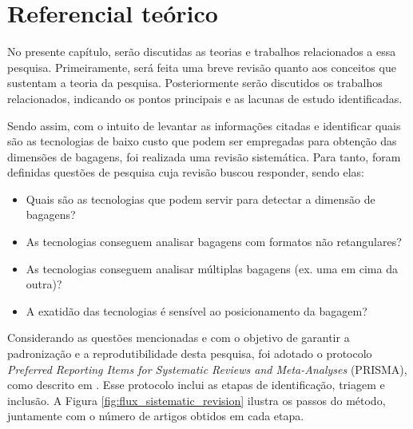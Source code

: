 \chapter[Referencial teórico]{Referencial teórico}
\label{cap_Referencial teorico}
    
    No presente capítulo, serão discutidas as teorias e trabalhos relacionados a essa pesquisa. Primeiramente, será feita uma breve revisão quanto aos conceitos que sustentam a teoria da pesquisa. Posteriormente serão discutidos os trabalhos relacionados, indicando os pontos principais e as lacunas de estudo identificadas.  
    
    Sendo assim, com o intuito de levantar as informações citadas e identificar quais são as tecnologias de baixo custo que podem ser empregadas para obtenção das dimensões de bagagens, foi realizada uma revisão sistemática. Para tanto, foram definidas questões de pesquisa cuja revisão buscou responder, sendo elas:
    
    \begin{itemize}
        \item Quais são as tecnologias que podem servir para detectar a dimensão de bagagens?
        \item As tecnologias conseguem analisar bagagens com formatos não retangulares?
        \item As tecnologias conseguem analisar múltiplas bagagens (ex. uma em cima da outra)?
        \item A exatidão das tecnologias é sensível ao posicionamento da bagagem?
    \end{itemize}
    

    Considerando as questões mencionadas e com o objetivo de garantir a padronização e a reprodutibilidade desta pesquisa, foi adotado o protocolo \textit{Preferred Reporting Items for Systematic Reviews and Meta-Analyses} (PRISMA), como descrito em \cite{moher_2009_preferred}. Esse protocolo inclui as etapas de identificação, triagem e inclusão. A Figura \ref{fig:flux_sistematic_revision} ilustra os passos do método, juntamente com o número de artigos obtidos em cada etapa.

